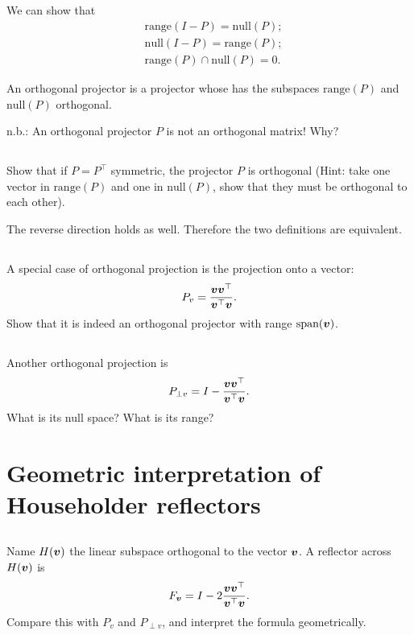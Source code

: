 \documentclass[11pt,letterpaper]{report}
\begin{document}
\subsection{}
We can show that
\begin{align*}
    & \text{range}(I-P) = \text{null}(P);\\
    & \text{null}(I-P) = \text{range}(P);\\
    & \text{range}(P) \cap \text{null}(P) = 0.
\end{align*}

An orthogonal projector is a projector whose has the subspaces $\text{range}(P)$ and $\text{null}(P)$ orthogonal.

n.b.: An orthogonal projector $P$ is not an orthogonal matrix! Why?

\subsection{}
Show that if $P=P^\top$ symmetric, the projector $P$ is orthogonal (Hint: take one vector in $\text{range}(P)$ and one in $\text{null}(P)$, show that they must be orthogonal to each other). 

The reverse direction holds as well. Therefore the two definitions are equivalent.

\subsection{}
A special case of orthogonal projection is the projection onto a vector:
\begin{align*}
    P_v = \frac{\boldsymbol{v} \boldsymbol{v}^\top}{\boldsymbol{v}^\top \boldsymbol{v}}.
\end{align*}
Show that it is indeed an orthogonal projector with range $\text{span}(\boldsymbol{v})$.

\subsection{}
Another orthogonal projection is
\begin{align*}
    P_{\perp v} = I-\frac{\boldsymbol{v} \boldsymbol{v}^\top}{\boldsymbol{v}^\top \boldsymbol{v}}.
\end{align*}
What is its null space? What is its range?

\section{Geometric interpretation of Householder reflectors}
\subsection{}
Name $H(\boldsymbol{v})$ the linear subspace orthogonal to the vector $\boldsymbol{v}$. A reflector across $H(\boldsymbol{v})$ is 
\begin{align*}
    F_{\boldsymbol{v}} = I - 2 \frac{\boldsymbol{v} \boldsymbol{v}^\top}{\boldsymbol{v}^\top \boldsymbol{v}}.
\end{align*}
Compare this with $P_v$ and $P_{\perp v}$, and interpret the formula geometrically.
\end{document}
